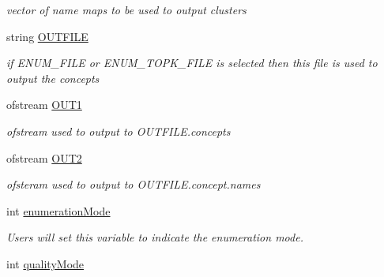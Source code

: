 \begin{DoxyCompactItemize}
\begin{DoxyCompactList}\small\item\em vector of name maps to be used to output clusters \item\end{DoxyCompactList}\item 
\hypertarget{class_lattice_algos_aaf79cc2e8513fd28bf1e9329c3e678ab}{
string \hyperlink{class_lattice_algos_aaf79cc2e8513fd28bf1e9329c3e678ab}{OUTFILE}}
\label{class_lattice_algos_aaf79cc2e8513fd28bf1e9329c3e678ab}

\begin{DoxyCompactList}\small\item\em if ENUM\_\-FILE or ENUM\_\-TOPK\_\-FILE is selected then this file is used to output the concepts \item\end{DoxyCompactList}\item 
\hypertarget{class_lattice_algos_a5e06ea8a8e76d5b6019481e778655a5c}{
ofstream \hyperlink{class_lattice_algos_a5e06ea8a8e76d5b6019481e778655a5c}{OUT1}}
\label{class_lattice_algos_a5e06ea8a8e76d5b6019481e778655a5c}

\begin{DoxyCompactList}\small\item\em ofstream used to output to OUTFILE.concepts \item\end{DoxyCompactList}\item 
\hypertarget{class_lattice_algos_ad6ee83e69ef859717cbc747edf4fc306}{
ofstream \hyperlink{class_lattice_algos_ad6ee83e69ef859717cbc747edf4fc306}{OUT2}}
\label{class_lattice_algos_ad6ee83e69ef859717cbc747edf4fc306}

\begin{DoxyCompactList}\small\item\em ofsteram used to output to OUTFILE.concept.names \item\end{DoxyCompactList}\item 
\hypertarget{class_lattice_algos_a03adc61166377c993b4d1ef8f8ee12ee}{
int \hyperlink{class_lattice_algos_a03adc61166377c993b4d1ef8f8ee12ee}{enumerationMode}}
\label{class_lattice_algos_a03adc61166377c993b4d1ef8f8ee12ee}

\begin{DoxyCompactList}\small\item\em Users will set this variable to indicate the enumeration mode. \item\end{DoxyCompactList}\item 
\hypertarget{class_lattice_algos_aabdafd3fa45b3ed1d773b313e3a60e17}{
int \hyperlink{class_lattice_algos_aabdafd3fa45b3ed1d773b313e3a60e17}{qualityMode}}
\label{class_lattice_algos_aabdafd3fa45b3ed1d773b313e3a60e17}


\end{DoxyCompactItemize}
